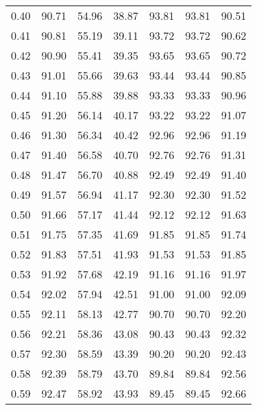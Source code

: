 \begin{tabular}{|c|c|c|c|c|c|c|}
      0.40 &     90.71 &     54.96 &      38.87 &   93.81 &      93.81 &         90.51 \\
      0.41 &     90.81 &     55.19 &      39.11 &   93.72 &      93.72 &         90.62 \\
      0.42 &     90.90 &     55.41 &      39.35 &   93.65 &      93.65 &         90.72 \\
      0.43 &     91.01 &     55.66 &      39.63 &   93.44 &      93.44 &         90.85 \\
      0.44 &     91.10 &     55.88 &      39.88 &   93.33 &      93.33 &         90.96 \\
      0.45 &     91.20 &     56.14 &      40.17 &   93.22 &      93.22 &         91.07 \\
      0.46 &     91.30 &     56.34 &      40.42 &   92.96 &      92.96 &         91.19 \\
      0.47 &     91.40 &     56.58 &      40.70 &   92.76 &      92.76 &         91.31 \\
      0.48 &     91.47 &     56.70 &      40.88 &   92.49 &      92.49 &         91.40 \\
      0.49 &     91.57 &     56.94 &      41.17 &   92.30 &      92.30 &         91.52 \\
      0.50 &     91.66 &     57.17 &      41.44 &   92.12 &      92.12 &         91.63 \\
      0.51 &     91.75 &     57.35 &      41.69 &   91.85 &      91.85 &         91.74 \\
      0.52 &     91.83 &     57.51 &      41.93 &   91.53 &      91.53 &         91.85 \\
      0.53 &     91.92 &     57.68 &      42.19 &   91.16 &      91.16 &         91.97 \\
      0.54 &     92.02 &     57.94 &      42.51 &   91.00 &      91.00 &         92.09 \\
      0.55 &     92.11 &     58.13 &      42.77 &   90.70 &      90.70 &         92.20 \\
      0.56 &     92.21 &     58.36 &      43.08 &   90.43 &      90.43 &         92.32 \\
      0.57 &     92.30 &     58.59 &      43.39 &   90.20 &      90.20 &         92.43 \\
      0.58 &     92.39 &     58.79 &      43.70 &   89.84 &      89.84 &         92.56 \\
      0.59 &     92.47 &     58.92 &      43.93 &   89.45 &      89.45 &         92.66 \\

\end{tabular}
